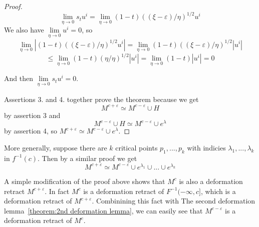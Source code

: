 \begin{proof}
   \[ 
      \lim\limits_{\eta \to 0} s_t u^i 
      = \lim\limits_{\eta \to 0} (1 - t)((\xi - \varepsilon)/\eta)^{1/2}u^i
   \]
   We also have $\lim\limits_{\eta \to 0} u^i = 0$, so
   \[ 
      \lim\limits_{\eta \to 0} |(1 - t)((\xi - \varepsilon)/\eta)^{1/2}u^i| 
      = \lim\limits_{\eta \to 0} (1 - t)((\xi - \varepsilon)/\eta)^{1/2}|u^i| 
   \]
   \[ 
      \leq \lim\limits_{\eta \to 0} (1 - t)(\eta/\eta)^{1/2}|u^i| 
      = \lim\limits_{\eta \to 0} (1 - t)|u^i| = 0 
   \]

   And then $\lim\limits_{\eta \to 0} s_t u^i = 0$.
   
   Assertions 3. and 4. together prove the theorem because we get 
   \[ M^{c + \varepsilon} \simeq M^{c-\varepsilon} \cup H \]
   by assertion 3 and
   \[ M^{c-\varepsilon} \cup H \simeq M^{c - \varepsilon} \cup e^{\lambda} \]
   by assertion 4, so $M^{c + \varepsilon} \simeq M^{c - \varepsilon} \cup e^{\lambda}$.
 \end{proof}

\begin{remark}[Milnor]
   More generally, suppose there are $k$ critical points $p_1, ..., p_k$ with 
   indicies $\lambda_1, ..., \lambda_k$ in $f^{-1}(c)$. Then by a similar proof
   we get
   \[ 
      M^{c + \varepsilon} \simeq 
      M^{c - \varepsilon} \cup e^{\lambda_1} \cup ... \cup e^{\lambda_k} 
   \]
\end{remark}

\begin{remark}[Milnor]
   A simple modification of the proof above shows that $M^c$ is also a deformation
   retract $M^{c + \varepsilon}$. In fact $M^c$ is a deformation retract of 
   $F^{-1}(-\infty, c]$, which is a deformation retract of $M^{c + \varepsilon}$.
   Combinining this fact with The second deformation 
   lemma~\ref{theorem:2nd deformation lemma}, we can easily see that 
   $M^{c - \varepsilon}$ is a deformation retract of $M^c$.
\end{remark}
